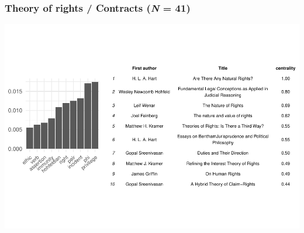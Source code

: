 \documentclass[
]{article}
\begin{document}
\hypertarget{theory-of-rights-contracts-n-41}{%
\subsubsection{\texorpdfstring{Theory of rights / Contracts (\emph{N} = 41)}{Theory of rights / Contracts (N = 41)}}\label{theory-of-rights-contracts-n-41}}

\begin{flushright}\includegraphics{paper_files/figure-latex/TR-1} \end{flushright}
\end{document}
